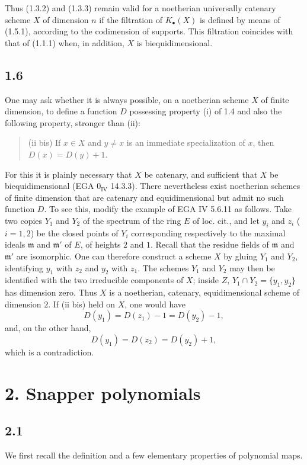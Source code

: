 Thus (1.3.2) and (1.3.3) remain valid for a noetherian universally catenary
scheme $X$ of dimension $n$ if the filtration of $K_\bullet(X)$ is defined by
means of (1.5.1), according to the codimension of supports. This filtration
coincides with that of (1.1.1) when, in addition, $X$ is biequidimensional.

\subsection*{1.6}
One may ask whether it is always possible, on a noetherian scheme $X$ of
finite dimension, to define a function $D$ possessing property (i) of 1.4
and also the following property, stronger than (ii):
\begin{quote}
(ii bis) If $x\in X$ and $y\ne x$ is an immediate specialization of $x$,
then $D(x)=D(y)+1$.
\end{quote}

For this it is plainly necessary that $X$ be catenary, and sufficient that
$X$ be biequidimensional (EGA $0_{\mathrm{IV}}$ 14.3.3). There nevertheless
exist noetherian schemes of finite dimension that are catenary and
equidimensional but admit no such function $D$. To see this, modify the
example of EGA IV 5.6.11 as follows. Take two copies $Y_1$ and $Y_2$ of the
spectrum of the ring $E$ of loc. cit., and let $y_i$ and $z_i$ ($i=1,2$) be
the closed points of $Y_i$ corresponding respectively to the maximal ideals
$\mathfrak m$ and $\mathfrak m'$ of $E$, of heights $2$ and $1$. Recall that
the residue fields of $\mathfrak m$ and $\mathfrak m'$ are isomorphic. One
can therefore construct a scheme $X$ by gluing $Y_1$ and $Y_2$, identifying
$y_1$ with $z_2$ and $y_2$ with $z_1$. The schemes $Y_1$ and $Y_2$ may then
be identified with the two irreducible components of $X$; inside $Z$,
$Y_1\cap Y_2=\{y_1,y_2\}$ has dimension zero. Thus $X$ is a noetherian,
catenary, equidimensional scheme of dimension $2$. If (ii bis) held on $X$,
one would have
\[
D(y_1)=D(z_1)-1=D(y_2)-1,
\]
and, on the other hand,
\[
D(y_1)=D(z_2)=D(y_2)+1,
\]
which is a contradiction.

\section*{2. Snapper polynomials}

\subsection*{2.1}
We first recall the definition and a few elementary properties of polynomial
maps.

